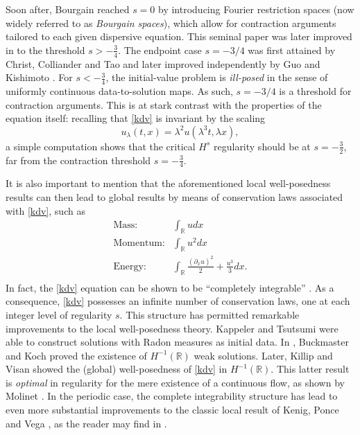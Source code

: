\documentclass[%
11pt,  reqno]{amsart}
\newcommand{\5}{\textup{V}}
\newcommand{\dx}{\partial_x}
\newcommand{\jp}{\color{red}}
\theoremstyle{remark}
\newcommand{\R}{\mathbb{R}}
\numberwithin{equation}{section}
\numberwithin{theorem}{section}
\begin{document}
Soon after, Bourgain \cite{bourg2} reached $s=0$ by introducing Fourier restriction spaces (now widely referred to as \emph{Bourgain spaces}), which allow for contraction arguments tailored to each given dispersive equation. This seminal paper was later improved in \cite{kpv_bilin} to the threshold $s>-\frac34$. The endpoint case $s=-3/4$ was first attained by Christ, Colliander and Tao \cite{christcolliandertao} and later improved independently by Guo \cite{Guo_kdv_34} and Kishimoto \cite{Kishimoto_lwp_crit}. For $s<-\frac34$, the initial-value problem is \emph{ill-posed} in the sense of uniformly continuous data-to-solution maps. As such, $s=-3/4$ is a threshold for contraction arguments. {\jp This is at stark contrast with the properties of the equation itself: recalling that \eqref{kdv} is invariant by the scaling
\begin{equation}\label{scaling}
u_\lambda(t,x)=\lambda^{2}u(\lambda^3 t, \lambda x),
\end{equation}
a simple computation shows that the critical $H^s$ regularity should be at $s=-\frac32$, far from the contraction threshold $s=-\frac34$.}
	
	\medskip

{\jp It is also important to mention that the} aforementioned local well-posedness results can then lead to global results \cite{bourg2, CKSTT_sharp_kdv, Guo_gwp} by means of conservation laws associated with \eqref{kdv}, {\jp such as}
\begin{align*}
\text{Mass:}& \int_\R u dx\\
\text{Momentum:}& \int_\R u^2 dx\\
\text{Energy:}& \int_\R \frac{(\dx u)^2}{2} + \frac{u^3}{3}  dx.\\
\end{align*}
In fact, the \eqref{kdv} equation can be shown to be ``completely integrable'' \cite{ZakharovFadeev}. As a consequence, \eqref{kdv} possesses an infinite number of conservation laws, one at each integer level of regularity $s$. This structure has permitted remarkable improvements to the local well-posedness theory. Kappeler \cite{Kappeler_rough} and Tsutsumi \cite{Tsutsumi_kdv_measures} were able to construct solutions with Radon measures as initial data. In \cite{BuckmasterKoch}, Buckmaster and Koch proved the existence of $H^{-1}(\R)$ weak solutions. Later, Killip and Visan \cite{KillipVisan_kdv} showed the (global) well-posedness of \eqref{kdv} in $H^{-1}(\R)$. This latter result is \emph{optimal} in regularity for the mere existence  of a continuous flow, as shown by Molinet \cite{Molinet_ill_line}. In the periodic case, the complete integrability structure has lead to even more substantial improvements to the classic local result of Kenig, Ponce and Vega \cite{kpv_bilin}, {\jp as the reader may find in }\cite{KT06, KMMT16, KappelerMolnar18}.
\end{document}
